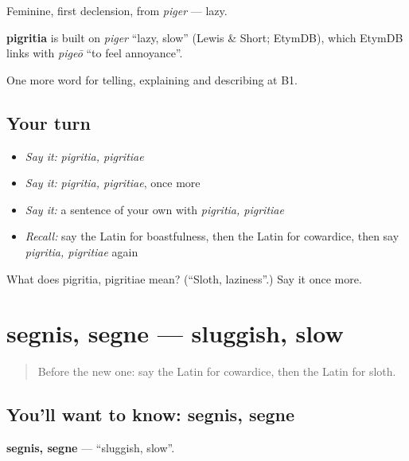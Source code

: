 Feminine, first declension, from \emph{piger} — lazy.

\begin{cousinweb}
\textbf{pigritia} is built on \emph{piger} \textquotedblleft{}lazy, slow\textquotedblright{} (Lewis \& Short; EtymDB), which EtymDB links with \emph{pigeō} \textquotedblleft{}to feel annoyance\textquotedblright{}.
\end{cousinweb}

\begin{grammarlens}[title={What you've built}]
One more word for telling, explaining and describing at B1.
\end{grammarlens}

\subsection*{Your turn}
\begin{itemize}
\raggedright
  \item \emph{Say it:} \emph{pigritia, pigritiae}
  \item \emph{Say it:} \emph{pigritia, pigritiae}, once more
  \item \emph{Say it:} a sentence of your own with \emph{pigritia, pigritiae}
  \item \emph{Recall:} say the Latin for boastfulness, then the Latin for cowardice, then say \emph{pigritia, pigritiae} again
\end{itemize}

\begin{tcolorbox}[breakable,colback=teal!4,colframe=teal!35!black,title={Before you move on}]
What does pigritia, pigritiae mean? (\textquotedblleft{}Sloth, laziness\textquotedblright{}.) Say it once more.
\end{tcolorbox}
\section[segnis, segne]{segnis, segne — sluggish, slow}

\label{lesson:LA-C508-segnis}



\begin{quote}
Before the new one: say the Latin for cowardice, then the Latin for sloth.
\end{quote}

\subsection*{You'll want to know: segnis, segne}
\textbf{segnis, segne} — \textquotedblleft{}sluggish, slow\textquotedblright{}.

